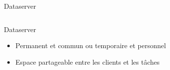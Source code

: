 \documentclass{beamer}
\begin{document}
\begin{frame}{Dataserver}
\begin{columns}
\begin{column}[r]{0.5\linewidth}
\begin{exampleblock}{Dataserver}
\begin{itemize}
             \item Permanent et commun ou temporaire et personnel
             \item Espace partageable entre les clients et les t\^aches
            \end{itemize}
            
        \end{exampleblock}
        
	\end{column}
	\end{columns}
    
\end{frame}
\end{document}
